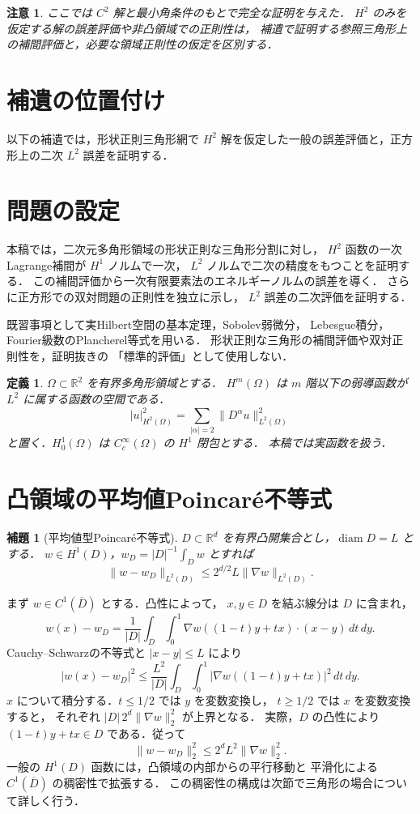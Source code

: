 \documentclass[a5paper,10pt,onecolumn]{jsarticle}
\makeatletter
\theoremstyle{mathnotetheorem}
\newtheorem{definition}[theorem]{定義}
\newtheorem{lemma}[theorem]{補題}
\newtheorem{remark}[theorem]{注意}
\renewcommand{\proofname}{証明}
\renewenvironment{proof}[1][\proofname]{%
  \par\pushQED{\qed}\normalfont\topsep4\p@\@plus2\p@\relax
  \trivlist\item[\hskip\labelsep\bfseries #1]\ignorespaces
}{\popQED\endtrivlist\@endpefalse}
\newcommand{\norm}[1]{\lVert #1\rVert}
\makeatother
\begin{document}
\begin{remark}
ここでは $C^2$ 解と最小角条件のもとで完全な証明を与えた．
$H^2$ のみを仮定する解の誤差評価や非凸領域での正則性は，
補遺で証明する参照三角形上の補間評価と，必要な領域正則性の仮定を区別する．
\end{remark}



\section{補遺の位置付け}
以下の補遺では，形状正則三角形網で $H^2$ 解を仮定した一般の誤差評価と，正方形上の二次 $L^2$ 誤差を証明する．

\section{問題の設定}
本稿では，二次元多角形領域の形状正則な三角形分割に対し，
$H^2$ 函数の一次Lagrange補間が $H^1$ ノルムで一次，
$L^2$ ノルムで二次の精度をもつことを証明する．
この補間評価から一次有限要素法のエネルギーノルムの誤差を導く．
さらに正方形での双対問題の正則性を独立に示し，
$L^2$ 誤差の二次評価を証明する．

既習事項として実Hilbert空間の基本定理，Sobolev弱微分，
Lebesgue積分，Fourier級数のPlancherel等式を用いる．
形状正則な三角形の補間評価や双対正則性を，証明抜きの
「標準的評価」として使用しない．

\begin{definition}
$\Omega\subset\mathbb R^2$ を有界多角形領域とする．
$H^m(\Omega)$ は $m$ 階以下の弱導函数が $L^2$ に属する函数の空間である．
\[
 |u|_{H^2(\Omega)}^2=
  \sum_{|\alpha|=2}\norm{D^\alpha u}_{L^2(\Omega)}^2
\]
と置く．$H_0^1(\Omega)$ は $C_c^\infty(\Omega)$ の $H^1$ 閉包とする．
本稿では実函数を扱う．
\end{definition}

\section{凸領域の平均値Poincar\'e不等式}
\begin{lemma}[平均値型Poincar\'e不等式]
$D\subset\mathbb R^d$ を有界凸開集合とし，$\operatorname{diam}D=L$ とする．
$w\in H^1(D)$，$w_D=|D|^{-1}\int_Dw$ とすれば
\[
 \norm{w-w_D}_{L^2(D)}\le2^{d/2}L\norm{\nabla w}_{L^2(D)}.
\]
\end{lemma}
\begin{proof}
まず $w\in C^1(\overline D)$ とする．凸性によって，
$x,y\in D$ を結ぶ線分は $D$ に含まれ，
\[
 w(x)-w_D=\frac1{|D|}\int_D\int_0^1
   \nabla w((1-t)y+tx)\cdot(x-y)\,dt\,dy.
\]
Cauchy--Schwarzの不等式と $|x-y|\le L$ により
\[
 |w(x)-w_D|^2
 \le\frac{L^2}{|D|}\int_D\int_0^1
  |\nabla w((1-t)y+tx)|^2\,dt\,dy.
\]
$x$ について積分する．$t\le1/2$ では $y$ を変数変換し，
$t\ge1/2$ では $x$ を変数変換すると，
それぞれ $|D|\,2^d\norm{\nabla w}_2^2$ が上界となる．
実際，$D$ の凸性により
$(1-t)y+tx\in D$ である．従って
\[
 \norm{w-w_D}_2^2\le2^d L^2\norm{\nabla w}_2^2.
\]
一般の $H^1(D)$ 函数には，凸領域の内部からの平行移動と
平滑化による $C^1(\overline D)$ の稠密性で拡張する．
この稠密性の構成は次節で三角形の場合について詳しく行う．
\end{proof}
\end{document}

